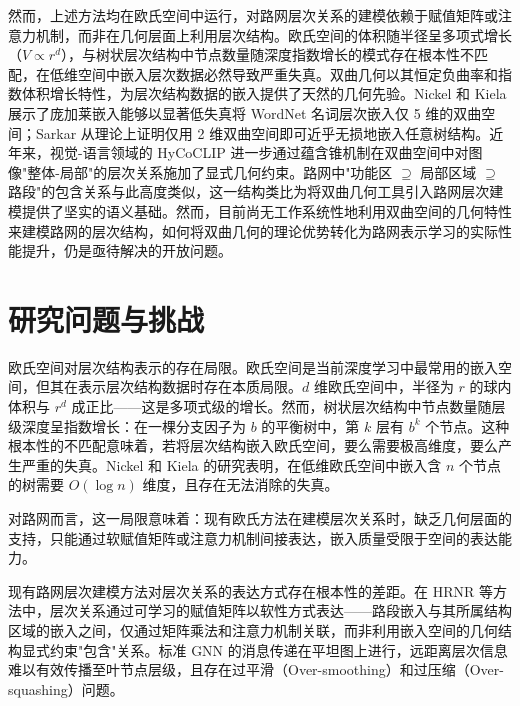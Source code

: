 然而，上述方法均在欧氏空间中运行，对路网层次关系的建模依赖于赋值矩阵或注意力机制，而非在几何层面上利用层次结构。欧氏空间的体积随半径呈多项式增长（$V \propto r^d$），与树状层次结构中节点数量随深度指数增长的模式存在根本性不匹配，在低维空间中嵌入层次数据必然导致严重失真\cite{sarkar2011low,nickel2017poincare}。双曲几何以其恒定负曲率和指数体积增长特性，为层次结构数据的嵌入提供了天然的几何先验\cite{krioukov2010hyperbolic,peng2022hyperbolic}。Nickel 和 Kiela\cite{nickel2017poincare} 展示了庞加莱嵌入能够以显著低失真将 WordNet 名词层次嵌入仅 5 维的双曲空间；Sarkar\cite{sarkar2011low} 从理论上证明仅用 2 维双曲空间即可近乎无损地嵌入任意树结构。近年来，视觉-语言领域的 HyCoCLIP\cite{pal2025hycoclip} 进一步通过蕴含锥\cite{ganea2018entailment}机制在双曲空间中对图像"整体-局部"的层次关系施加了显式几何约束。路网中"功能区 $\supseteq$ 局部区域 $\supseteq$ 路段"的包含关系与此高度类似，这一结构类比为将双曲几何工具引入路网层次建模提供了坚实的语义基础。然而，目前尚无工作系统性地利用双曲空间的几何特性来建模路网的层次结构，如何将双曲几何的理论优势转化为路网表示学习的实际性能提升，仍是亟待解决的开放问题。

\section{研究问题与挑战}

欧氏空间对层次结构表示的存在局限。欧氏空间是当前深度学习中最常用的嵌入空间，但其在表示层次结构数据时存在本质局限。$d$ 维欧氏空间中，半径为 $r$ 的球内体积与 $r^d$ 成正比——这是多项式级的增长。然而，树状层次结构中节点数量随层级深度呈指数增长：在一棵分支因子为 $b$ 的平衡树中，第 $k$ 层有 $b^k$ 个节点。这种根本性的不匹配意味着，若将层次结构嵌入欧氏空间，要么需要极高维度，要么产生严重的失真\cite{sarkar2011low,nickel2017poincare}。Nickel 和 Kiela\cite{nickel2017poincare} 的研究表明，在低维欧氏空间中嵌入含 $n$ 个节点的树需要 $O(\log n)$ 维度，且存在无法消除的失真。

对路网而言，这一局限意味着：现有欧氏方法在建模层次关系时，缺乏几何层面的支持，只能通过软赋值矩阵或注意力机制间接表达，嵌入质量受限于空间的表达能力。

现有路网层次建模方法对层次关系的表达方式存在根本性的差距。在 HRNR 等方法中，层次关系通过可学习的赋值矩阵以软性方式表达——路段嵌入与其所属结构区域的嵌入之间，仅通过矩阵乘法和注意力机制关联，而非利用嵌入空间的几何结构显式约束"包含"关系。标准 GNN 的消息传递在平坦图上进行，远距离层次信息难以有效传播至叶节点层级，且存在过平滑（Over-smoothing）和过压缩（Over-squashing）问题\cite{topping2022oversquashing}。

